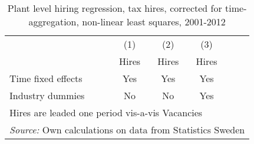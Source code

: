 \begin{table}[htbp]\centering
\def\sym#1{\ifmmode^{#1}\else\(^{#1}\)\fi}
\caption{\label{tab:robust_tax_hires_timeagg_nls} Plant level hiring regression, tax hires, corrected for time-aggregation, non-linear least squares,  2001-2012}
\begin{tabular}{l*{5}{c}}
\hline\hline
                &\multicolumn{1}{c}{(1)}&\multicolumn{1}{c}{(2)}&\multicolumn{1}{c}{(3)}\\
                &\multicolumn{1}{c}{Hires}&\multicolumn{1}{c}{Hires}&\multicolumn{1}{c}{Hires}\\
\hline


\hline 
Time fixed effects  &         Yes         &         Yes         &         Yes                      \\
[1em]
Industry dummies    &          No         &          No         &         Yes               \\
[1em]
\hline 


\hline\hline
\multicolumn{6}{l}{\footnotesize Hires are leaded one period vis-a-vis Vacancies}\\
\multicolumn{6}{l}{\footnotesize \emph{Source:} Own calculations on data from Statistics Sweden}\\
\end{tabular}
\end{table}


